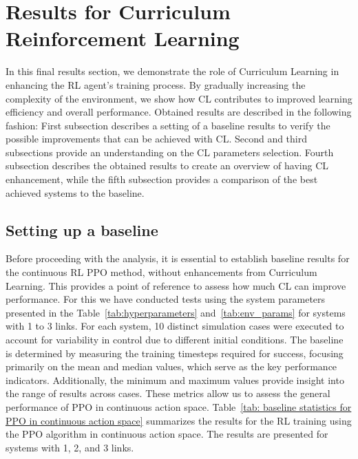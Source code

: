 \section{Results for Curriculum Reinforcement Learning} \label{sec: Results - Curriculum Reinforcement Learning}

In this final results section, we demonstrate the role of Curriculum Learning in enhancing the RL agent’s training process. By gradually increasing the complexity of the environment, we show how CL contributes to improved learning efficiency and overall performance. Obtained results are described in the following fashion:
First subsection describes a setting of a baseline results to verify the possible improvements that can be achieved with CL. Second and third subsections provide an understanding on the CL parameters selection. Fourth subsection describes the obtained results to create an overview of having CL enhancement, while the fifth subsection provides a comparison of the best achieved systems to the baseline. 

\subsection{Setting up a baseline}

Before proceeding with the analysis, it is essential to establish baseline results for the continuous RL PPO method, without enhancements from Curriculum Learning. This provides a point of reference to assess how much CL can improve performance. For this we have conducted tests using the system parameters presented in the Table~\ref{tab:hyperparameters} and~\ref{tab:env_params} for systems with 1 to 3 links. For each system, 10 distinct simulation cases were executed to account for variability in control due to different initial conditions. The baseline is determined by measuring the training timesteps required for success, focusing primarily on the mean and median values, which serve as the key performance indicators. Additionally, the minimum and maximum values provide insight into the range of results across cases. These metrics allow us to assess the general performance of PPO in continuous action space. Table~\ref{tab: baseline statistics for PPO in continuous action space} summarizes the results for the RL training using the PPO algorithm in continuous action space. The results are presented for systems with 1, 2, and 3 links.


